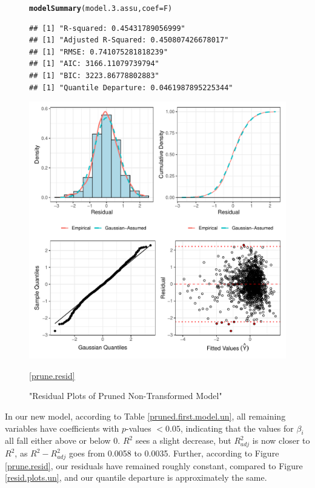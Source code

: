 \documentclass{article}\usepackage[]{graphicx}\usepackage[]{xcolor}
\makeatletter
\def\maxwidth{ %
  \ifdim\Gin@nat@width>\linewidth
    \linewidth
  \else
    \Gin@nat@width
  \fi
}
\newcommand{\hlstd}[1]{\textcolor[rgb]{0.345,0.345,0.345}{#1}}%
\newcommand{\hlkwc}[1]{\textcolor[rgb]{0.333,0.667,0.333}{#1}}%
\newcommand{\hlkwd}[1]{\textcolor[rgb]{0.737,0.353,0.396}{\textbf{#1}}}%
\newenvironment{kframe}{%
 \def\at@end@of@kframe{}%
 \ifinner\ifhmode%
  \def\at@end@of@kframe{\end{minipage}}%
  \begin{minipage}{\columnwidth}%
 \fi\fi%
 \def\FrameCommand##1{\hskip\@totalleftmargin \hskip-\fboxsep
 \colorbox{shadecolor}{##1}\hskip-\fboxsep
     \hskip-\linewidth \hskip-\@totalleftmargin \hskip\columnwidth}%
 \MakeFramed {\advance\hsize-\width
   \@totalleftmargin\z@ \linewidth\hsize
   \@setminipage}}%
 {\par\unskip\endMakeFramed%
 \at@end@of@kframe}
\newenvironment{knitrout}{}{} %
\makeatother
\begin{document}
\begin{figure}
\begin{knitrout}
\color{fgcolor}\begin{kframe}
\begin{alltt}
\hlkwd{modelSummary}\hlstd{(model.3.assu,} \hlkwc{coef}\hlstd{=F)}
\end{alltt}
\begin{verbatim}
## [1] "R-squared: 0.45431789056999"
## [1] "Adjusted R-Squared: 0.450807426678017"
## [1] "RMSE: 0.741075281818239"
## [1] "AIC: 3166.11079739794"
## [1] "BIC: 3223.86778802883"
## [1] "Quantile Departure: 0.0461987895225344"
\end{verbatim}
\end{kframe}
\includegraphics[width=\maxwidth]{figure/unnamed-chunk-17-1} 
\end{knitrout}
\caption{"Residual Plots of Pruned Non-Transformed Model"}
\ref{prune.resid}
\end{figure}

In our new model, according to Table \ref{pruned.first.model.un}, all remaining variables have coefficients with $p$-values $< 0.05$, indicating that the values for $\beta_i$ all fall either above or below 0. $R^2$ sees a slight decrease, but $R^2_{adj}$ is now closer to $R^2$, as $R^2 - R^2_{adj}$ goes from 0.0058 to 0.0035. Further, according to Figure \ref{prune.resid}, our residuals have remained roughly constant, compared to Figure \ref{resid.plots.un}, and our quantile departure is approximately the same.
\end{document}
